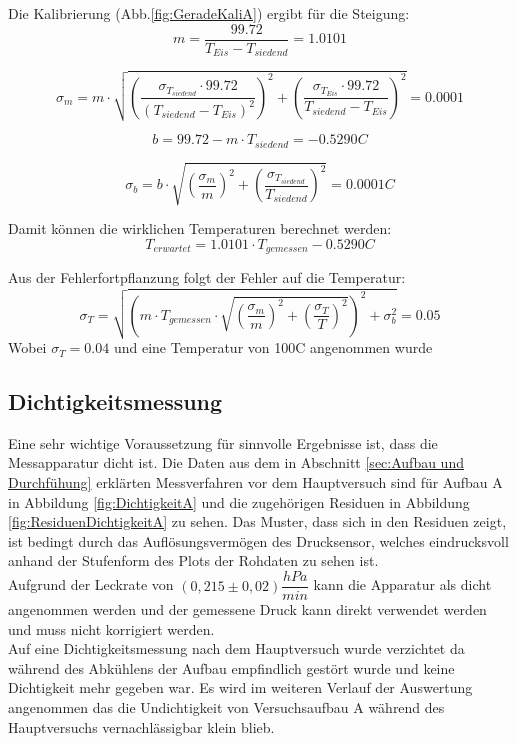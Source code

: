 \documentclass[12pt,a4paper]{article}
\begin{document}
Die Kalibrierung (Abb.\ref{fig:GeradeKaliA}) ergibt für die Steigung:
\begin{equation}
m = \dfrac{99.72}{T_{Eis}-T_{siedend}} = 1.0101
\end{equation}

\begin{equation}
\sigma_{m} = m\cdot \sqrt{(\dfrac{\sigma_{T_{siedend}}\cdot 99.72}{(T_{siedend}-T_{Eis})^{2}})^{2}+(\dfrac{\sigma_{T_{Eis}}\cdot 99.72}{T_{siedend}-T_{Eis}})^{2}} = 0.0001
\end{equation}

\begin{equation}
b = 99.72-m\cdot T_{siedend} = -0.5290C
\end{equation}

\begin{equation}
\sigma_{b} = b\cdot \sqrt{(\dfrac{\sigma_{m}}{m})^{2}+(\dfrac{\sigma_{T_{siedend}}}{T_{siedend}})^{2}} = 0.0001C
\end{equation}


Damit können die wirklichen Temperaturen berechnet werden:
\begin{equation}
T_{erwartet}=1.0101\cdot T_{gemessen}-0.5290C
\end{equation}

Aus der Fehlerfortpflanzung folgt der Fehler auf die Temperatur:
\begin{equation}
\sigma_{T}=\sqrt{\left(m\cdot T_{gemessen}\cdot \sqrt{ (\dfrac{\sigma_m}{m})^{2}+(\dfrac{\sigma_T}{T})^{2}}\right)^{2}+\sigma_{b}^{2}}=0.05
\end{equation}
Wobei $\sigma_T = 0.04$ und eine Temperatur von 100C angenommen wurde\\









\subsection{Dichtigkeitsmessung}
Eine sehr wichtige Voraussetzung für sinnvolle Ergebnisse ist, dass die Messapparatur dicht ist. Die Daten aus dem in Abschnitt \ref{sec:Aufbau und Durchfühung} erklärten Messverfahren vor dem Hauptversuch sind für Aufbau A in Abbildung \ref{fig:DichtigkeitA} und die zugehörigen Residuen in Abbildung \ref{fig:ResiduenDichtigkeitA} zu sehen. Das Muster, dass sich in den Residuen zeigt, ist bedingt durch das Auflösungsvermögen des Drucksensor, welches eindrucksvoll anhand der Stufenform des Plots der Rohdaten zu sehen ist. \\
Aufgrund der Leckrate von $(0,215 \pm 0,02) \dfrac{hPa}{min}$ kann die Apparatur als dicht angenommen werden und der gemessene Druck kann direkt verwendet werden und muss nicht korrigiert werden.\\
Auf eine Dichtigkeitsmessung nach dem Hauptversuch wurde verzichtet da während des Abkühlens der Aufbau empfindlich gestört wurde und keine Dichtigkeit mehr gegeben war. Es wird im weiteren Verlauf der Auswertung angenommen das die Undichtigkeit von Versuchsaufbau A während des Hauptversuchs vernachlässigbar klein blieb.
\end{document}
